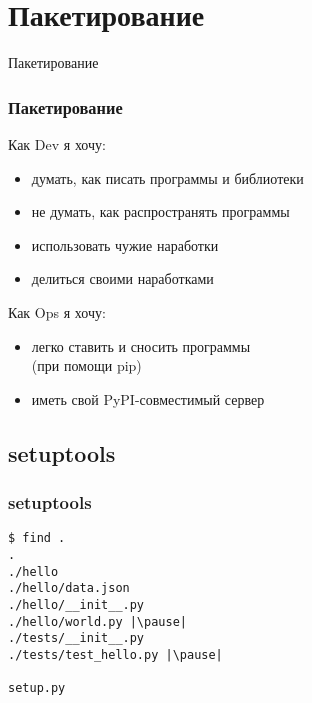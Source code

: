 \documentclass[10pt,pdf,utf8,russian,aspectratio=169,xcolor=dvipsnames,x11names,center]{beamer}
\begin{document}
\section{Пакетирование}

\begin{frame}
  \begin{center}
    {\Huge Пакетирование}
  \end{center}
\end{frame}

\begin{frame}
  \frametitle{Пакетирование}
  \centering
  
  \begin{minipage}{9cm}
    Как Dev я хочу:
    \begin{itemize}
    \item думать, как писать программы и библиотеки
    \item не думать, как распространять программы
    \item использовать чужие наработки
    \item делиться своими наработками
    \end{itemize}
  \end{minipage}

  \vspace{0.6cm}
  \pause
  \begin{minipage}{9cm}
    Как Ops я хочу:
    \begin{itemize}
    \item легко ставить и сносить программы\\(при помощи pip)
    \item иметь свой PyPI-совместимый сервер
    \end{itemize}
  \end{minipage}
\end{frame}

\subsection{setuptools}

\begin{frame}[fragile]
  \frametitle{setuptools}

  \begin{lstlisting}[escapeinside=||]
$ find .
.
./hello
./hello/data.json
./hello/__init__.py
./hello/world.py |\pause|
./tests/__init__.py
./tests/test_hello.py |\pause|

setup.py
  \end{lstlisting}
\end{frame}
\end{document}
